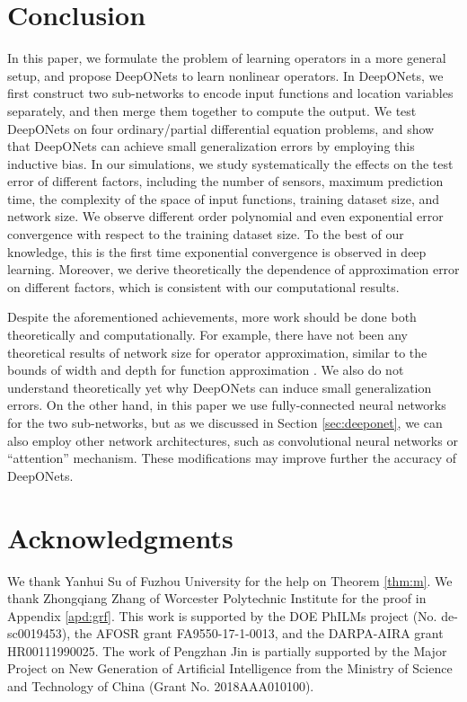 \documentclass[11pt]{article}
\begin{document}
\section{Conclusion}
\label{sec:conc}

In this paper, we formulate the problem of learning operators in a more general setup, and propose DeepONets to learn nonlinear operators. In DeepONets, we first construct two sub-networks to encode input functions and location variables separately, and then merge them together to compute the output. We test DeepONets on four ordinary/partial differential equation problems, and show that DeepONets can achieve small generalization errors by employing this inductive bias. In our simulations, we study systematically the effects on the test error of different factors, including the number of sensors, maximum prediction time, the complexity of the space of input functions, training dataset size, and network size. We observe different order polynomial and even exponential error convergence with respect to the training dataset size. To the best of our knowledge, this is the first time exponential convergence is observed in deep learning. Moreover, we derive theoretically the dependence of approximation error on different factors, which is consistent with our computational results.

Despite the aforementioned achievements, more work should be done both theoretically and computationally. For example, there have not been any theoretical results of network size for operator approximation, similar to the bounds of width and depth for function approximation \cite{hanin2017universal}. We also do not understand theoretically yet why DeepONets can induce small generalization errors. On the other hand, in this paper we use fully-connected neural networks for the two sub-networks, but as we discussed in Section \ref{sec:deeponet}, we can also employ other network architectures, such as convolutional neural networks or ``attention'' mechanism. These modifications may improve further the accuracy of DeepONets.

\section{Acknowledgments}

We thank Yanhui Su of Fuzhou University for the help on Theorem \ref{thm:m}. We thank Zhongqiang Zhang of Worcester Polytechnic Institute for the proof in Appendix \ref{apd:grf}. This work is supported by the DOE PhILMs project (No. de-sc0019453), the AFOSR grant FA9550-17-1-0013, and the DARPA-AIRA grant HR00111990025. The work of Pengzhan Jin is partially supported by the Major Project on New Generation of Artificial Intelligence from the Ministry of Science and Technology of China (Grant No. 2018AAA010100).
\end{document}
